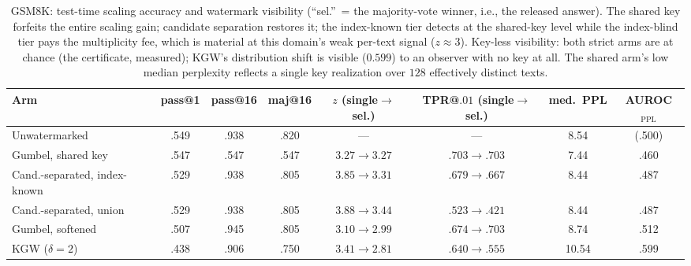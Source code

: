 \documentclass{article} %
\begin{document}
\begin{table}[h]
\caption{GSM8K: test-time scaling accuracy and watermark visibility
(``sel.''\ = the majority-vote winner, i.e., the released answer). The
shared key forfeits the entire scaling gain; candidate separation restores
it; the index-known tier detects at the shared-key level while the
index-blind tier pays the multiplicity fee, which is material at this
domain's weak per-text signal ($z\approx3$). Key-less visibility: both
strict arms are at chance (the certificate, measured); KGW's distribution
shift is visible ($0.599$) to an observer with no key at all. The shared
arm's low median perplexity reflects a single key realization over $128$
effectively distinct texts.}
\label{tab:gsm}
\begin{center}
\scriptsize
\setlength{\tabcolsep}{3pt}
\begin{tabular}{lccccccc}
\toprule
Arm & pass@1 & pass@16 & maj@16 & $z$ (single$\to$sel.) & TPR@$.01$ (single$\to$sel.) & med.\ PPL & AUROC$_{\mathrm{PPL}}$ \\
\midrule
Unwatermarked & .549 & .938 & .820 & --- & --- & 8.54 & (.500) \\
Gumbel, shared key & .547 & .547 & .547 & $3.27\to3.27$ & $.703\to.703$ & 7.44 & .460 \\
Cand.-separated, index-known & .529 & .938 & .805 & $3.85\to3.31$ & $.679\to.667$ & 8.44 & .487 \\
Cand.-separated, union & .529 & .938 & .805 & $3.88\to3.44$ & $.523\to.421$ & 8.44 & .487 \\
Gumbel, softened & .507 & .945 & .805 & $3.10\to2.99$ & $.674\to.703$ & 8.74 & .512 \\
KGW ($\delta{=}2$) & .438 & .906 & .750 & $3.41\to2.81$ & $.640\to.555$ & 10.54 & .599 \\
\bottomrule
\end{tabular}
\end{center}
\end{table}
\end{document}

